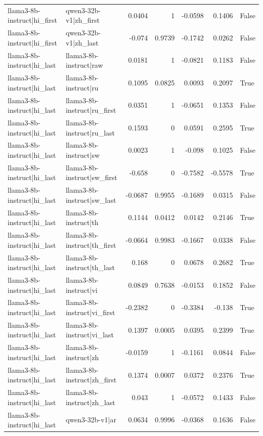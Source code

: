\begin{table}
\begin{tabular}{l l r r r r l}
llama3-8b-instruct|hi_first & qwen3-32b-v1|zh_first & 0.0404 & 1 & -0.0598 & 0.1406 & False \\
llama3-8b-instruct|hi_first & qwen3-32b-v1|zh_last & -0.074 & 0.9739 & -0.1742 & 0.0262 & False \\
llama3-8b-instruct|hi_last & llama3-8b-instruct|raw & 0.0181 & 1 & -0.0821 & 0.1183 & False \\
llama3-8b-instruct|hi_last & llama3-8b-instruct|ru & 0.1095 & 0.0825 & 0.0093 & 0.2097 & True \\
llama3-8b-instruct|hi_last & llama3-8b-instruct|ru_first & 0.0351 & 1 & -0.0651 & 0.1353 & False \\
llama3-8b-instruct|hi_last & llama3-8b-instruct|ru_last & 0.1593 & 0 & 0.0591 & 0.2595 & True \\
llama3-8b-instruct|hi_last & llama3-8b-instruct|sw & 0.0023 & 1 & -0.098 & 0.1025 & False \\
llama3-8b-instruct|hi_last & llama3-8b-instruct|sw_first & -0.658 & 0 & -0.7582 & -0.5578 & True \\
llama3-8b-instruct|hi_last & llama3-8b-instruct|sw_last & -0.0687 & 0.9955 & -0.1689 & 0.0315 & False \\
llama3-8b-instruct|hi_last & llama3-8b-instruct|th & 0.1144 & 0.0412 & 0.0142 & 0.2146 & True \\
llama3-8b-instruct|hi_last & llama3-8b-instruct|th_first & -0.0664 & 0.9983 & -0.1667 & 0.0338 & False \\
llama3-8b-instruct|hi_last & llama3-8b-instruct|th_last & 0.168 & 0 & 0.0678 & 0.2682 & True \\
llama3-8b-instruct|hi_last & llama3-8b-instruct|vi & 0.0849 & 0.7638 & -0.0153 & 0.1852 & False \\
llama3-8b-instruct|hi_last & llama3-8b-instruct|vi_first & -0.2382 & 0 & -0.3384 & -0.138 & True \\
llama3-8b-instruct|hi_last & llama3-8b-instruct|vi_last & 0.1397 & 0.0005 & 0.0395 & 0.2399 & True \\
llama3-8b-instruct|hi_last & llama3-8b-instruct|zh & -0.0159 & 1 & -0.1161 & 0.0844 & False \\
llama3-8b-instruct|hi_last & llama3-8b-instruct|zh_first & 0.1374 & 0.0007 & 0.0372 & 0.2376 & True \\
llama3-8b-instruct|hi_last & llama3-8b-instruct|zh_last & 0.043 & 1 & -0.0572 & 0.1433 & False \\
llama3-8b-instruct|hi_last & qwen3-32b-v1|ar & 0.0634 & 0.9996 & -0.0368 & 0.1636 & False \\

\end{tabular}
\end{table}
